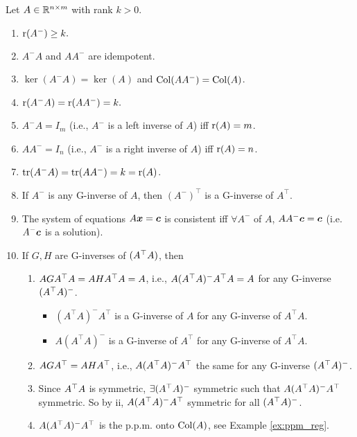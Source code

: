 \documentclass[10pt,a4paper]{book}
\begin{document}
\begin{thmbox}
	\begin{theorem}\label{thm:gen_inv}
		Let $A\in\mathbb R^{n\times m}$ with rank $k>0$.
			\begin{enumerate}
				\item $\mathrm{r}( A^- ) \geq k.$
				\item $A^-A$ and $AA^-$ are idempotent.
				\item $\ker(A^- A)=\ker(A)$ and $\mathrm{Col}(AA^-)=\mathrm{Col}(A)$. 
				\item $\mathrm{r}( A^- A) = \mathrm{r}( AA^- ) = k.$
				\item $A^- A= I_m$ (i.e., $A^-$ is a left inverse of $A$) iff $\mathrm{r}(A)=m$.  
				\item $AA^-=I_n$ (i.e., $A^-$ is a right inverse of $A$) iff $\mathrm{r}(A)=n$.
				\item $\mathrm{tr}(A^-A)=\mathrm{tr}(AA^-)=k=\mathrm{r}(A)$.
				\item If $A^-$ is any G-inverse of $A$, then $(A^-)^\top$ is a G-inverse of $A^\top$.
				\item The system of equations $A{\boldsymbol x}={\boldsymbol c}$ is consistent iff $\forall A^-$ of $A$, $AA^-{\boldsymbol c}={\boldsymbol c}$ (i.e. $A^-{\boldsymbol c}$ is a solution).    
				\item If $G,H$ are G-inverses of $(A^\top A)$, then 
				\begin{enumerate}
					\item $AGA^\top A=AHA^\top A=A$, i.e., $A(A^\top A)^{-}A^\top A=A$ for any G-inverse $(A^\top A)^{-}$.
					\begin{itemize}
						\item $(A^\top A)^-A^\top$ is a G-inverse of $A$ for any G-inverse of $A^\top A.$
						\item $A(A^\top A)^-$ is a G-inverse of $A^\top$ for any G-inverse of $A^\top A.$
					\end{itemize}
					\item $AGA^\top=AHA^\top$, i.e., $A(A^\top A)^{-}A^\top$ the same for any G-inverse $(A^\top A)^{-}$.
					\item Since $A^\top A$ is symmetric, $\exists (A^\top A)^{-}$ symmetric such that $A(A^\top A)^{-}A^\top$ symmetric. So by ii, $A(A^\top A)^{-}A^\top$ symmetric for all $(A^\top A)^{-}$.      
					\item $A(A^\top A)^{-}A^\top$ is the p.p.m. onto $\mathrm{Col}(A)$, see Example \ref{ex:ppm_reg}. 
				\end{enumerate}  
			\end{enumerate}
	\end{theorem}
\end{thmbox}
\end{document}
